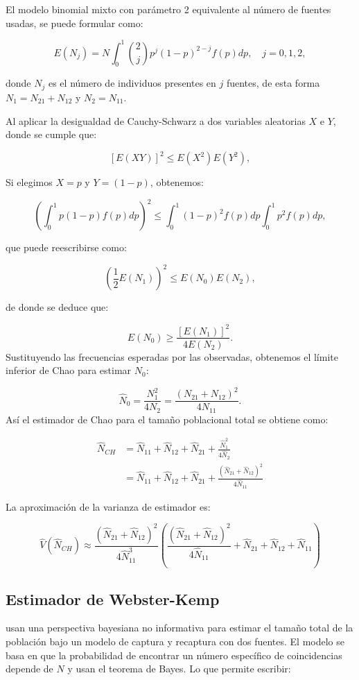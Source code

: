 \documentclass[
  12pt,
]{book}
\begin{document}
El modelo binomial mixto con parámetro 2 equivalente al número de fuentes usadas, se puede formular como:

\[E(N_j) = N \int_0^1 \binom{2}{j} p^j (1-p)^{2-j} f(p) dp, \quad j = 0, 1, 2,\]

donde \(N_j\) es el número de individuos presentes en \(j\) fuentes, de esta forma \(N_1 = N_{21} + N_{12}\) y \(N_2 = N_{11}\).

Al aplicar la desigualdad de Cauchy-Schwarz a dos variables aleatorias \(X\) e \(Y\), donde se cumple que:

\[[E(XY)]^2 \leq E(X^2)E(Y^2),\]

Si elegimos \(X = p\) y \(Y = (1-p)\), obtenemos:

\[\left(\int_0^1 p(1-p)f(p) dp\right)^2 \leq \int_0^1 (1-p)^2 f(p)dp \int_0^1 p^2 f(p)dp,\]

que puede reescribirse como:

\[\left(\frac{1}{2}E(N_1)\right)^2 \leq E(N_0)E(N_2),\]

de donde se deduce que:

\[E(N_0) \geq \frac{\left[E(N_1)\right]^2}{4E(N_2)}.\]
Sustituyendo las frecuencias esperadas por las observadas, obtenemos el límite inferior de Chao para estimar \(N_0\):

\[\hat{N}_0 =  \frac{N_{1}^2}{4N_{2}} = \frac{(N_{21}+N_{12})^2}{4N_{11}}.\]
Así el estimador de Chao para el tamaño poblacional total se obtiene como:

\begin{align}
\hat{N}_{CH} &= \hat{N}_{11} + \hat{N}_{12} + \hat{N}_{21} + \frac{\hat{N}_{1}^2}{4\hat{N}_{2}}\\
             &= \hat{N}_{11} + \hat{N}_{12} + \hat{N}_{21} + \frac{(\hat{N}_{21}+\hat{N}_{12})^2}{4\hat{N}_{11}}
\end{align}

La aproximación de la varianza de estimador es:

\[
\hat{V}(\hat{N}_{CH}) \approx \frac{(\hat{N}_{21}+\hat{N}_{12
})^2}{4\hat{N}_{11}^3} \left( \frac{(\hat{N}_{21}+\hat{N}_{12})^2}{4\hat{N}_{11}} + \hat{N}_{21}+\hat{N}_{12} + \hat{N}_{11} \right)
\]

\subsection{Estimador de Webster-Kemp}\label{estimador-de-webster-kemp}

\citet{webster2013estimating} usan una perspectiva bayesiana no informativa para estimar el tamaño total de la población bajo un modelo de captura y recaptura con dos fuentes. El modelo se basa en que la probabilidad de encontrar un número específico de coincidencias depende de \(N\) y usan el teorema de Bayes. Lo que permite escribir:
\end{document}

